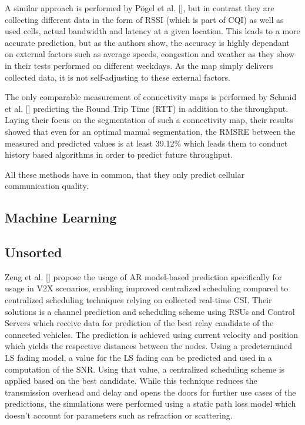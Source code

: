 \documentclass{IEEEtran}
\begin{document}
A similar approach is performed by Pögel et al. [], but in contrast they are collecting different data in the form of RSSI (which is part of CQI) as well as used cells, actual bandwidth and latency at a given location. This leads to a more accurate prediction, but as the authors show, the accuracy is highly dependant on external factors such as average speeds, congestion and weather as they show in their tests performed on different weekdays. As the map simply delivers collected data, it is not self-adjusting to these external factors.

The only comparable measurement of connectivity maps is performed by Schmid et al. [] predicting the Round Trip Time (RTT) in addition to the throughput. Laying their focus on the segmentation of such a connectivity map, their results showed that even for an optimal manual segmentation, the RMSRE between the measured and predicted values is at least 39.12\% which leads them to conduct history based algorithms in order to predict future throughput.

All these methods have in common, that they only predict cellular communication quality.

\subsection{Machine Learning}


\subsection{Unsorted}


Zeng et al. [] propose the usage of AR model-based prediction specifically for usage in V2X scenarios, enabling improved centralized scheduling compared to centralized scheduling techniques relying on collected real-time CSI. 
Their solutions is a channel prediction and scheduling scheme using RSUs and Control Servers which receive data for prediction of the best relay candidate of the connected vehicles. The prediction is achieved using current velocity and position which yields the respective distances between the nodes. Using a predetermined LS fading model, a value for the LS fading can be predicted and used in a computation of the SNR. Using that value, a centralized scheduling scheme is applied based on the best candidate.
While this technique reduces the transmission overhead and delay and opens the doors for further use cases of the predictions, the simulations were performed using a static path loss model which doesn’t account for parameters such as refraction or scattering.
\end{document}
